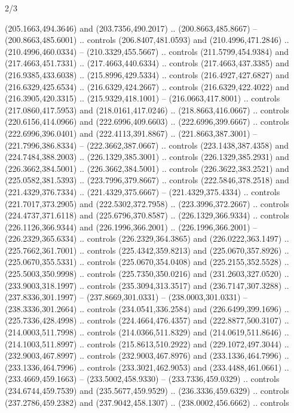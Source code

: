 \begin{flagdescription}{2/3}
\begin{scope}[xshift=0.5\flaglength,yshift=0.5\flagwidth,scale=\flagwidth/525.28]
\begin{scope}[y=0.1mm, x=0.1mm, yscale=-1,shift={(-381.5,-404)}]
\begin{scope}[shift={(5.25001,4.53053)},miter limit=4.00,line width=0.800\lw]
  (205.1663,494.3646) and (203.7356,490.2017) .. (200.8663,485.8667) --
  (200.8663,485.6001) .. controls (206.8407,481.0593) and (210.4996,471.2846) ..
  (210.4996,460.0334) -- (210.3329,455.5667) .. controls (211.5799,454.9384) and
  (217.4663,451.7331) .. (217.4663,440.6334) .. controls (217.4663,437.3385) and
  (216.9385,433.6038) .. (215.8996,429.5334) .. controls (216.4927,427.6827) and
  (216.6329,425.6534) .. (216.6329,424.2667) .. controls (216.6329,422.4022) and
  (216.3905,420.3315) .. (215.9329,418.1001) -- (216.0663,417.8001) .. controls
  (217.0860,417.5953) and (218.0161,417.0246) .. (218.8663,416.0667) .. controls
  (220.6156,414.0966) and (222.6996,409.6603) .. (222.6996,399.6667) .. controls
  (222.6996,396.0401) and (222.4113,391.8867) .. (221.8663,387.3001) --
  (221.7996,386.8334) -- (222.3662,387.0667) .. controls (223.1438,387.4358) and
  (224.7484,388.2003) .. (226.1329,385.3001) .. controls (226.1329,385.2931) and
  (226.3662,384.5001) .. (226.3662,384.5001) .. controls (226.3622,383.2521) and
  (225.0582,381.5393) .. (223.7996,379.8667) .. controls (222.5846,378.2518) and
  (221.4329,376.7334) .. (221.4329,375.6667) -- (221.4329,375.4334) .. controls
  (221.7017,373.2905) and (222.5302,372.7958) .. (223.3996,372.2667) .. controls
  (224.4737,371.6118) and (225.6796,370.8587) .. (226.1329,366.9334) .. controls
  (226.1126,366.9344) and (226.1996,366.2001) .. (226.1996,366.2001) --
  (226.2329,365.6334) .. controls (226.2329,364.3865) and (226.0222,363.1497) ..
  (225.7662,361.7001) .. controls (225.4342,359.8213) and (225.0670,357.8926) ..
  (225.0670,355.5331) .. controls (225.0670,354.0408) and (225.2155,352.5528) ..
  (225.5003,350.9998) .. controls (225.7350,350.0216) and (231.2603,327.0520) ..
  (233.9003,318.1997) .. controls (235.3094,313.3517) and (236.7147,307.3288) ..
  (237.8336,301.1997) -- (237.8669,301.0331) -- (238.0003,301.0331) --
  (238.3336,301.2664) .. controls (234.0541,336.2584) and (226.6499,399.1696) ..
  (225.7336,428.4998) .. controls (224.4664,476.4357) and (222.8877,500.3107) ..
  (214.0003,511.7998) .. controls (214.0366,511.8329) and (214.0619,511.8646) ..
  (214.1003,511.8997) .. controls (215.8613,510.2922) and (229.1072,497.3044) ..
  (232.9003,467.8997) .. controls (232.9003,467.8976) and (233.1336,464.7996) ..
  (233.1336,464.7996) .. controls (233.3021,462.9053) and (233.4488,461.0661) ..
  (233.4669,459.1663) -- (233.5002,458.9330) -- (233.7336,459.0329) .. controls
  (234.6744,459.7539) and (235.5677,459.9529) .. (236.3336,459.6329) .. controls
  (237.2786,459.2382) and (237.9042,458.1307) .. (238.0002,456.6662) .. controls

\end{scope}
\end{scope}
\end{scope}
\end{flagdescription}
